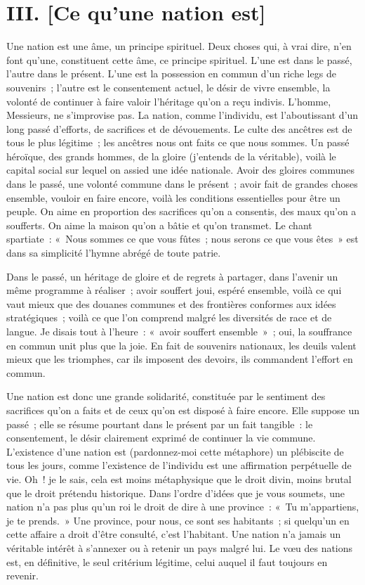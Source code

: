 \documentclass[twoside]{book} %
\newcommand\chaptercont{} %
\begin{document}
\chapter[{III. [Ce qu’une nation est]}]{III. [Ce qu’une nation est]}
\renewcommand{\leftmark}{III. [Ce qu’une nation est]}


\chaptercont
\noindent Une nation est une âme, un principe spirituel. Deux choses qui, à vrai dire, n’en font qu’une, constituent cette âme, ce principe spirituel. L’une est dans le passé, l’autre dans le présent. L’une est la possession en commun d’un riche legs de souvenirs ; l’autre est le consentement actuel, le désir de vivre ensemble, la volonté de continuer à faire valoir l’héritage qu’on a reçu indivis. L’homme, Messieurs, ne s’improvise pas. La nation, comme l’individu, est l’aboutissant d’un long passé d’efforts, de sacrifices et de dévouements. Le culte des ancêtres est de tous le plus légitime ; les ancêtres nous ont faits ce que nous sommes. Un passé héroïque, des grands hommes, de la gloire (j’entends de la véritable), voilà le capital social sur lequel on assied une idée nationale. Avoir des gloires communes dans le passé, une volonté commune dans le présent ; avoir fait de grandes choses ensemble, vouloir en faire encore, voilà les conditions essentielles pour être un peuple. On aime en proportion des sacrifices qu’on a consentis, des maux qu’on a soufferts. On aime la maison qu’on a bâtie et qu’on transmet. Le chant spartiate : « Nous sommes ce que vous fûtes ; nous serons ce que vous êtes » est dans sa simplicité l’hymne abrégé de toute patrie.\par
Dans le passé, un héritage de gloire et de regrets à partager, dans l’avenir un même programme à réaliser ; avoir souffert joui, espéré ensemble, voilà ce qui vaut mieux que des douanes communes et des frontières conformes aux idées stratégiques ; voilà ce que l’on comprend malgré les diversités de race et de langue. Je disais tout à l’heure : « avoir souffert ensemble » ; oui, la souffrance en commun unit plus que la joie. En fait de souvenirs nationaux, les deuils valent mieux que les triomphes, car ils imposent des devoirs, ils commandent l’effort en commun.\par
Une nation est donc une grande solidarité, constituée par le sentiment des sacrifices qu’on a faits et de ceux qu’on est disposé à faire encore. Elle suppose un passé ; elle se résume pourtant dans le présent par un fait tangible : le consentement, le désir clairement exprimé de continuer la vie commune. L’existence d’une nation est (pardonnez-moi cette métaphore) un plébiscite de tous les jours, comme l’existence de l’individu est une affirmation perpétuelle de vie. Oh ! je le sais, cela est moins métaphysique que le droit divin, moins brutal que le droit prétendu historique. Dans l’ordre d’idées que je vous soumets, une nation n’a pas plus qu’un roi le droit de dire à une province : « Tu m’appartiens, je te prends. » Une province, pour nous, ce sont ses habitants ; si quelqu’un en cette affaire a droit d’être consulté, c’est l’habitant. Une nation n’a jamais un véritable intérêt à s’annexer ou à retenir un pays malgré lui. Le vœu des nations est, en définitive, le seul critérium légitime, celui auquel il faut toujours en revenir.\par
\end{document}
